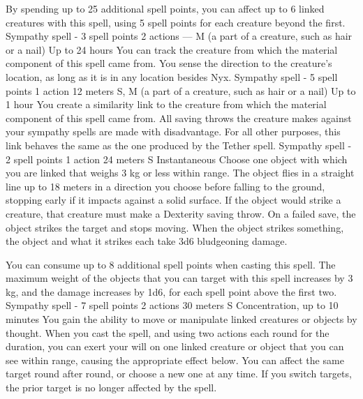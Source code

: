         By spending up to 25 additional spell points, you can affect up to 6 linked creatures with this spell, using 5 spell points for each creature beyond the first.
        {Sympathy spell - 3 spell points}
        {2 actions}
        {---}
        {M (a part of a creature, such as hair or a nail)}
        {Up to 24 hours}
        You can track the creature from which the material component of this spell came from.
        You sense the direction to the creature's location, as long as it is in any location besides Nyx.
        {Sympathy spell - 5 spell points}
        {1 action}
        {12 meters}
        {S, M (a part of a creature, such as hair or a nail)}
        {Up to 1 hour}
        You create a similarity link to the creature from which the material component of this spell came from.
        All saving throws the creature makes against your sympathy spells are made with disadvantage.
        For all other purposes, this link behaves the same as the one produced by the Tether spell.
        {Sympathy spell - 2 spell points}
        {1 action}
        {24 meters}
        {S}
        {Instantaneous}
        Choose one object with which you are linked that weighs 3 kg or less within range.
        The object flies in a straight line up to 18 meters in a direction you choose before falling to the ground, stopping early if it impacts against a solid surface.
        If the object would strike a creature, that creature must make a Dexterity saving throw.
        On a failed save, the object strikes the target and stops moving.
        When the object strikes something, the object and what it strikes each take 3d6 bludgeoning damage.

        You can consume up to 8 additional spell points when casting this spell.
        The maximum weight of the objects that you can target with this spell increases by 3 kg, and the damage increases by 1d6, for each spell point above the first two.
        {Sympathy spell - 7 spell points}
        {2 actions}
        {30 meters}
        {S}
        {Concentration, up to 10 minutes}
        You gain the ability to move or manipulate linked creatures or objects by thought.
        When you cast the spell, and using two actions each round for the duration, you can exert your will on one linked creature or object that you can see within range, causing the appropriate effect below.
        You can affect the same target round after round, or choose a new one at any time.
        If you switch targets, the prior target is no longer affected by the spell.

